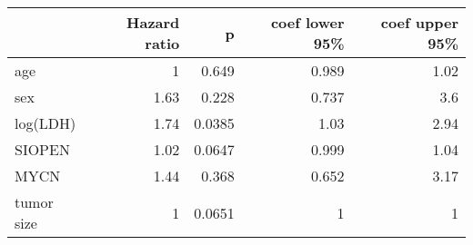 \begin{tabular}{lrrrr}
\toprule
{} &  Hazard ratio &      p &  coef lower 95\% &  coef upper 95\% \\
\midrule
age        &             1 &  0.649 &            0.989 &             1.02 \\
sex        &          1.63 &  0.228 &            0.737 &              3.6 \\
log(LDH)   &          1.74 & 0.0385 &             1.03 &             2.94 \\
SIOPEN     &          1.02 & 0.0647 &            0.999 &             1.04 \\
MYCN       &          1.44 &  0.368 &            0.652 &             3.17 \\
tumor size &             1 & 0.0651 &                1 &                1 \\
\bottomrule
\end{tabular}
